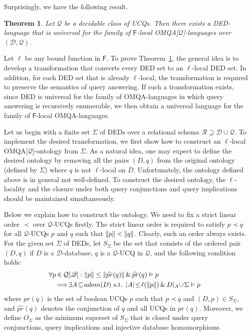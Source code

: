 \documentclass[letterpaper]{article} %
\newtheorem{thm}{Theorem}
\theoremstyle{definition}
\theoremstyle{remark}
\theoremstyle{definition}
\begin{document}
Surprisingly, we have the following result.

\begin{thm}\label{thm:univ_lang_exist}
Let $\mathcal{Q}$ be a decidable class of UCQs. Then there exists a DED-language that is universal for the family of $\mathsf{F}$-local OMQA[$\mathcal{Q}$]-languages over $(\mathscr{D},\mathscr{Q})$.
\end{thm}

Let $\ell$ be any bound function in $\mathsf{F}$. To prove Theorem~\ref{thm:univ_lang_exist}, the general idea is to develop a transformation that converts every DED set to an $\ell$-local DED set. In addition, for each DED set that is already $\ell$-local, the transformation is required to preserve the semantics of query answering. If such a transformation exists, since DED is universal for the family of OMQA-languages in which query answering is recursively enumerable, we then obtain a universal language for the family of $\mathsf{F}$-local OMQA-languages.

Let us begin with a finite set $\Sigma$ of DEDs over a relational schema $\mathscr{R}\supseteq\mathscr{D}\cup\mathscr{Q}$. To implement the desired transformation, we first show how to construct an $\ell$-local OMQA[$\mathcal{Q}$]-ontology from $\Sigma$. As a natural idea, one may expect to define the desired ontology by removing all the pairs $(D,q)$ from the original ontology (defined by $\Sigma$) where $q$ is not $\ell$-local on $D$. Unfortunately, the ontology defined above is in general not well-defined. To construct the desired ontology, the $\ell$-locality and the closure under both query conjunctions and query implications should be maintained simultaneously. 

Below we explain how to construct the ontology. We need to fix a strict linear order $\prec$ over $\mathscr{Q}$-UCQs firstly. The strict linear order is required to satisfy $p\prec q$ for all $\mathscr{Q}$-UCQs $p$ and $q$ such that $\dl p\dl<\dl q\dl$. Clearly, such an order always exists. For the given set $\Sigma$ of DEDs, let $S_\Sigma$ be the set that consists of the ordered pair $(D,q)$ if $D$ is a $\mathscr{D}$-database, $q$ is a $\mathscr{Q}$-UCQ in $\mathcal{Q}$, and the following condition holds:
\begin{equation}\label{eqn:condition}
\begin{aligned}
\hspace{-.16cm}\forall p&\hspace{-.03cm}\in\hspace{-.03cm}\mathcal{Q}[\mathscr{Q}]:\dl p\dl\le\dl\widehat{pr}(q)\dl\,\&\,\widehat{pr}(q)\vDash p\\
&\!\Longrightarrow\!
\exists A\!\subseteq\!adom(D)\text{ s.t. }|A|\!\le\!\ell(\dl p\dl)\,\&\,D|_A\!\cup\hspace{-.05cm}\Sigma\vDash p
\end{aligned}
\end{equation}
where $pr(q)$ is the set of boolean UCQs $p$ such that $p\prec q$ and $(D,p)\in S_\Sigma$, and $\widehat{pr}(q)$ denotes the conjunction of $q$ and all UCQs in $pr(q)$. Moreover, we define $O_\Sigma$ as the minimum superset of $S_\Sigma$ that is closed under query conjunctions, query implications and injective database homomorphisms.
\end{document}
